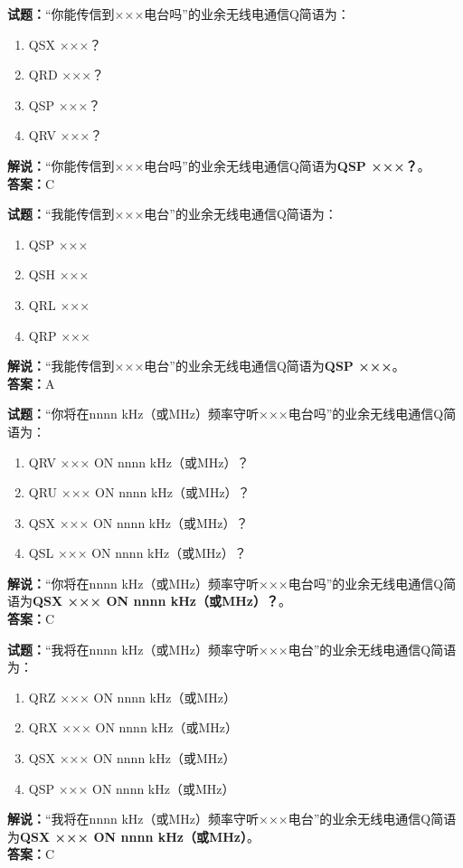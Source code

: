 \documentclass{ctexbook}
\begin{document}
\bigskip


\noindent\textbf{试题：}“你能传信到×××电台吗”的业余无线电通信Q简语为：
\begin{enumerate}[leftmargin=3em]
\item QSX ×××？
\item QRD ×××？
\item QSP ×××？
\item QRV ×××？
\end{enumerate}
\noindent\textbf{解说：}“你能传信到×××电台吗”的业余无线电通信Q简语为\textbf{QSP ×××？}。\\\noindent\textbf{答案：}C



\bigskip


\noindent\textbf{试题：}“我能传信到×××电台”的业余无线电通信Q简语为：
\begin{enumerate}[leftmargin=3em]
\item QSP ×××
\item QSH ×××
\item QRL ×××
\item QRP ×××
\end{enumerate}
\noindent\textbf{解说：}“我能传信到×××电台”的业余无线电通信Q简语为\textbf{QSP ×××}。\\\noindent\textbf{答案：}A




\bigskip


\noindent\textbf{试题：}“你将在nnnn \si{\kHz}（或\unit{\MHz}）频率守听×××电台吗”的业余无线电通信Q简语为：
\begin{enumerate}[leftmargin=3em]
\item QRV ××× ON nnnn \si{\kHz}（或\unit{\MHz}）？
\item QRU ××× ON nnnn \si{\kHz}（或\unit{\MHz}）？
\item QSX ××× ON nnnn \si{\kHz}（或\unit{\MHz}）？
\item QSL ××× ON nnnn \si{\kHz}（或\unit{\MHz}）？
\end{enumerate}
\noindent\textbf{解说：}“你将在nnnn \si{\kHz}（或\unit{\MHz}）频率守听×××电台吗”的业余无线电通信Q简语为\textbf{QSX ××× ON nnnn \si{\kHz}（或\unit{\MHz}）？}。\\\noindent\textbf{答案：}C



\bigskip


\noindent\textbf{试题：}“我将在nnnn \si{\kHz}（或\unit{\MHz}）频率守听×××电台”的业余无线电通信Q简语为：
\begin{enumerate}[leftmargin=3em]
\item QRZ ××× ON nnnn \si{\kHz}（或\unit{\MHz}）
\item QRX ××× ON nnnn \si{\kHz}（或\unit{\MHz}）
\item QSX ××× ON nnnn \si{\kHz}（或\unit{\MHz}）
\item QSP ××× ON nnnn \si{\kHz}（或\unit{\MHz}）
\end{enumerate}
\noindent\textbf{解说：}“我将在nnnn \si{\kHz}（或\unit{\MHz}）频率守听×××电台”的业余无线电通信Q简语为\textbf{QSX ××× ON nnnn \si{\kHz}（或\unit{\MHz}）}。\\\noindent\textbf{答案：}C
\end{document}

